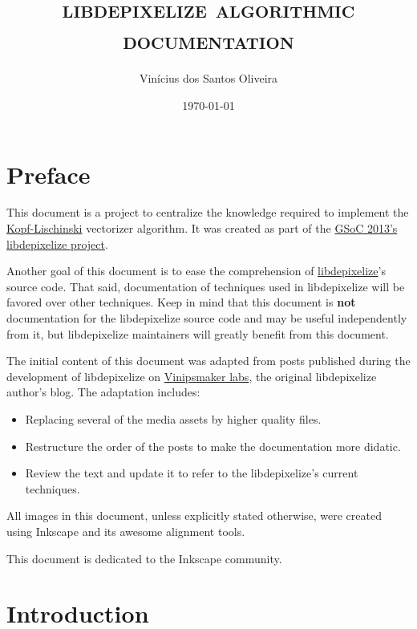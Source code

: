 \documentclass{report}
\title{\textsc{libdepixelize algorithmic documentation}}
\author{Vinícius dos Santos Oliveira}
\date{\today}
\begin{document}
\maketitle
\tableofcontents
\pagebreak

\chapter{Preface}

This document is a project to centralize the knowledge required to implement the
\href{http://research.microsoft.com/en-us/um/people/kopf/pixelart/}{Kopf-Lischinski}
vectorizer algorithm. It was created as part of the
\href{http://www.google-melange.com/gsoc/project/google/gsoc2013/vinipsmaker/48002}{GSoC
2013's libdepixelize project}.

Another goal of this document is to ease the comprehension of
\href{https://launchpad.net/libdepixelize}{libdepixelize}'s source code. That
said, documentation of techniques used in libdepixelize will be favored over
other techniques. Keep in mind that this document is \textbf{not}
documentation for the libdepixelize source code and may be useful independently
from it, but libdepixelize maintainers will greatly benefit from this document.

The initial content of this document was adapted from posts published during the
development of libdepixelize on
\href{http://vinipsmaker.wordpress.com/category/computacao/gsoc2013-inkscape/}{Vinipsmaker
labs}, the original libdepixelize author's blog. The adaptation includes:

\begin{itemize}
\item Replacing several of the media assets by higher quality files.
\item Restructure the order of the posts to make the documentation more didatic.
\item Review the text and update it to refer to the libdepixelize's current
  techniques.
\end{itemize}

All images in this document, unless explicitly stated otherwise, were created
using Inkscape and its awesome alignment tools.

This document is dedicated to the Inkscape community.

\chapter{Introduction}
\end{document}
